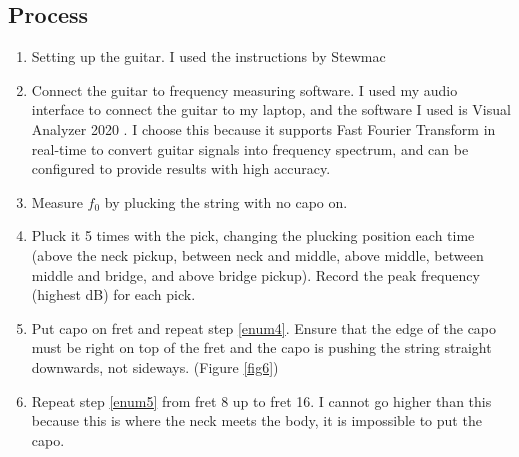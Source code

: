 \documentclass[11pt]{article}
\begin{document}
\begin{flushleft}
        \subsection{Process}
            \begin{enumerate}
                \item Setting up the guitar. I used the instructions by Stewmac \cite{stewmac}
                \item Connect the guitar to frequency measuring software. I used my audio interface to connect the guitar to my laptop, and the software I used is Visual Analyzer 2020 \cite{va20}. I choose this because it supports Fast Fourier Transform in real-time to convert guitar signals into frequency spectrum, and can be configured to provide results with high accuracy. 
                \item Measure $f_0$ by plucking the string with no capo on.
                \item Pluck it 5 times with the pick, changing the plucking position each time (above the neck pickup, between neck and middle, above middle, between middle and bridge, and above bridge pickup). Record the peak frequency (highest dB) for each pick. \label{enum4}
                \item Put capo on  fret and repeat step \ref{enum4}. Ensure that the edge of the capo must be right on top of the fret and the capo is pushing the string straight downwards, not sideways. (Figure \ref{fig6})\label{enum5}
                \item Repeat step \ref{enum5} from fret 8 up to fret 16. I cannot go higher than this because this is where the neck meets the body, it is impossible to put the capo.
            \end{enumerate}
            \newpage

\end{flushleft}
\end{document}
